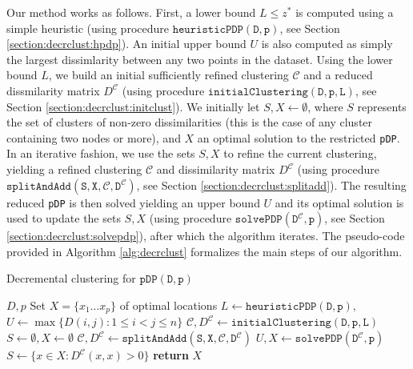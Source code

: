 \documentclass[a4paper,10pt]{article}
\newcommand{\pDP}{\texttt{pDP}}
\newcommand{\pdp}[2]{$\mathtt{pDP({#1}, {#2})}$}
\newcommand{\mC}{\mathcal{C}}
\newcommand{\DmC}{D^{\mC}}
\newcommand{\hpdp}[2]{$\mathtt{heuristicPDP({#1}, {#2})}$}
\newcommand{\initclust}[3]{$\mathtt{initialClustering({#1}, {#2}, {#3})}$}
\newcommand{\splitadd}[4]{$\mathtt{splitAndAdd({#1}, {#2}, {#3}, {#4})}$}
\newcommand{\solvePDP}[2]{$\mathtt{solvePDP({#1}, {#2})}$}
\begin{document}
Our method works as follows. First, a lower bound $L \leq z^*$ is computed using a simple heuristic (using procedure \hpdp{D}{p}, see Section \ref{section:decrclust:hpdp}). An initial upper bound $U$ is also computed as simply the largest dissimlarity between any two points in the dataset. Using the lower bound $L$, we build an initial sufficiently refined clustering $\mC$ and a reduced dissmilarity matrix $\DmC$ (using procedure \initclust{D}{p}{L}, see Section \ref{section:decrclust:initclust}). We initially let $S, X\leftarrow\emptyset$, where $S$ represents the set of clusters of non-zero dissimilarities (this is the case of any cluster containing two nodes or more), and $X$ an optimal solution to the restricted \pDP{}. In an iterative fashion, we use the sets $S, X$ to refine the current clustering, yielding a refined clustering $\mC$ and dissimilarity matrix $\DmC$ (using procedure \splitadd{S}{X}{\mC}{\DmC}, see Section \ref{section:decrclust:splitadd}). The resulting reduced \pDP{} is then solved yielding an upper bound $U$ and its optimal solution is used to update the sets $S, X$ (using procedure \solvePDP{\DmC}{p}, see Section \ref{section:decrclust:solvepdp}), after which the algorithm iterates. The pseudo-code provided in Algorithm \ref{alg:decrclust} formalizes the main steps of our algorithm.%


\begin{algorithm}[H]
	\caption{Decremental clustering for \pdp{D}{p}\label{alg:decrclust}}
	\begin{algorithmic}\normalsize
		\Require $D, p$
		\Ensure Set $X = \{x_1\ldots x_p\}$ of optimal locations
		\State $L\leftarrow$\hpdp{D}{p}, $U\leftarrow\max\{D(i, j): 1\leq i < j \leq n\}$
		\State $\mC, \DmC\leftarrow$\initclust{D}{p}{L}
		\State $S\leftarrow\emptyset, X\leftarrow\emptyset$
		\Repeat
			\State $\mC, \DmC\leftarrow$\splitadd{S}{X}{\mC}{\DmC}
			\State $U, X\leftarrow$\solvePDP{\DmC}{p}%
			\State $S\leftarrow\{x\in X : \DmC(x, x) > 0\}$
		\State \textbf{return} $X$
	\end{algorithmic}
\end{algorithm}
\end{document}
